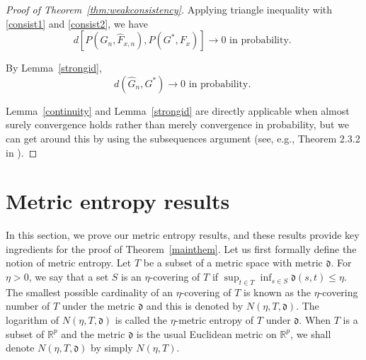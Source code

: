 \documentclass[11pt]{article}
\numberwithin{equation}{section}
\newcommand{\RS}{\mathbb{R}}
\begin{document}
\begin{appendices}
\begin{proof}[Proof of Theorem~\ref{thm:weakconsistency}]
Applying triangle inequality with \eqref{consist1} and \eqref{consist2}, we have
\[
d[P(\hat{G}_n, \hat{F}_{x,n}),P(G^*, F_{x})] \rightarrow 0 \text{ in probability. }
\]

By Lemma~\ref{strongid},
\[
d(\hat{G}_n, G^*) \rightarrow 0 \text{ in probability. }
\]

Lemma~\ref{continuity} and Lemma~\ref{strongid} are directly applicable when almost surely convergence holds rather than merely convergence in probability, but we can get around this by using the subsequences argument (see, e.g., Theorem 2.3.2 in \citet{durrett2019probability}).

\end{proof}







\section{Metric entropy results}
\label{sec:metric}
In this section, we prove our metric entropy results, and these results provide key ingredients for the proof of Theorem~\ref{mainthem}. Let us first formally define the notion of metric entropy. Let $T$ be a subset of a metric space with metric $\mathfrak{d}$. For $\eta > 0$, we say that a set $S$ is an $\eta$-covering of $T$ if $\sup_{t \in T} \inf_{s \in S} \mathfrak{d}(s, t) \leq \eta$. The smallest possible cardinality of an $\eta$-covering of $T$ is known as the $\eta$-covering number of $T$ under the metric $\mathfrak{d}$ and this is denoted by $N(\eta, T, \mathfrak{d})$. The logarithm of $N(\eta, T, \mathfrak{d})$ is called the $\eta$-metric entropy of $T$ under $\mathfrak{d}$. When $T$ is a subset of $\RS^p$  and the metric $\mathfrak{d}$ is the usual Euclidean metric on $\RS^p$, we shall denote $N(\eta, T, \mathfrak{d})$ by simply $N(\eta, T)$. 


\end{appendices}
\end{document}

